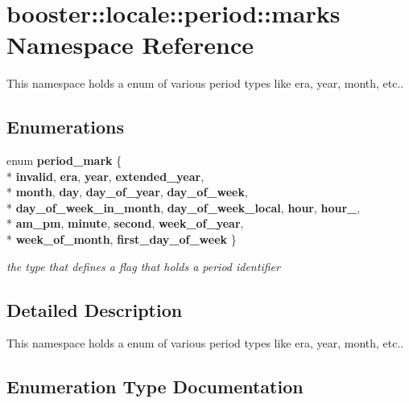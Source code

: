 \section{booster\+:\+:locale\+:\+:period\+:\+:marks Namespace Reference}
\label{namespacebooster_1_1locale_1_1period_1_1marks}


This namespace holds a enum of various period types like era, year, month, etc..  


\subsection*{Enumerations}
\begin{DoxyCompactItemize}
\item 
enum {\bf period\+\_\+mark} \{ \\*
{\bf invalid}, 
{\bf era}, 
{\bf year}, 
{\bf extended\+\_\+year}, 
\\*
{\bf month}, 
{\bf day}, 
{\bf day\+\_\+of\+\_\+year}, 
{\bf day\+\_\+of\+\_\+week}, 
\\*
{\bf day\+\_\+of\+\_\+week\+\_\+in\+\_\+month}, 
{\bf day\+\_\+of\+\_\+week\+\_\+local}, 
{\bf hour}, 
{\bf hour\+\_}, 
\\*
{\bf am\+\_\+pm}, 
{\bf minute}, 
{\bf second}, 
{\bf week\+\_\+of\+\_\+year}, 
\\*
{\bf week\+\_\+of\+\_\+month}, 
{\bf first\+\_\+day\+\_\+of\+\_\+week}
 \}\begin{DoxyCompactList}\small\item\em the type that defines a flag that holds a period identifier \end{DoxyCompactList}
\end{DoxyCompactItemize}


\subsection{Detailed Description}
This namespace holds a enum of various period types like era, year, month, etc.. 

\subsection{Enumeration Type Documentation}
